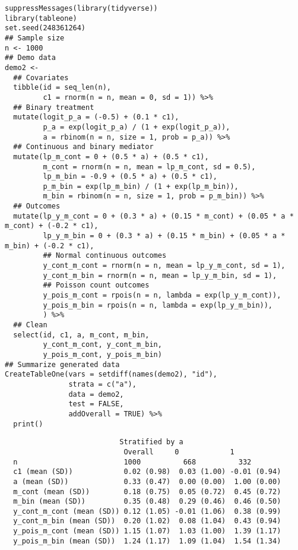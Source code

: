 \documentclass[dvipdfmx,10pt]{article}
\begin{document}
\scriptsize
\begin{verbatim}
suppressMessages(library(tidyverse))
library(tableone)
set.seed(248361264)
## Sample size
n <- 1000
## Demo data
demo2 <-
  ## Covariates
  tibble(id = seq_len(n),
         c1 = rnorm(n = n, mean = 0, sd = 1)) %>%
  ## Binary treatment
  mutate(logit_p_a = (-0.5) + (0.1 * c1),
         p_a = exp(logit_p_a) / (1 + exp(logit_p_a)),
         a = rbinom(n = n, size = 1, prob = p_a)) %>%
  ## Continuous and binary mediator
  mutate(lp_m_cont = 0 + (0.5 * a) + (0.5 * c1),
         m_cont = rnorm(n = n, mean = lp_m_cont, sd = 0.5),
         lp_m_bin = -0.9 + (0.5 * a) + (0.5 * c1),
         p_m_bin = exp(lp_m_bin) / (1 + exp(lp_m_bin)),
         m_bin = rbinom(n = n, size = 1, prob = p_m_bin)) %>%
  ## Outcomes
  mutate(lp_y_m_cont = 0 + (0.3 * a) + (0.15 * m_cont) + (0.05 * a * m_cont) + (-0.2 * c1),
         lp_y_m_bin = 0 + (0.3 * a) + (0.15 * m_bin) + (0.05 * a * m_bin) + (-0.2 * c1),
         ## Normal continuous outcomes
         y_cont_m_cont = rnorm(n = n, mean = lp_y_m_cont, sd = 1),
         y_cont_m_bin = rnorm(n = n, mean = lp_y_m_bin, sd = 1),
         ## Poisson count outcomes
         y_pois_m_cont = rpois(n = n, lambda = exp(lp_y_m_cont)),
         y_pois_m_bin = rpois(n = n, lambda = exp(lp_y_m_bin)),
         ) %>%
  ## Clean
  select(id, c1, a, m_cont, m_bin,
         y_cont_m_cont, y_cont_m_bin,
         y_pois_m_cont, y_pois_m_bin)
## Summarize generated data
CreateTableOne(vars = setdiff(names(demo2), "id"),
               strata = c("a"),
               data = demo2,
               test = FALSE,
               addOverall = TRUE) %>%
  print()
\end{verbatim}

\begin{verbatim}
                           Stratified by a
                            Overall     0            1           
  n                         1000          668          332       
  c1 (mean (SD))            0.02 (0.98)  0.03 (1.00) -0.01 (0.94)
  a (mean (SD))             0.33 (0.47)  0.00 (0.00)  1.00 (0.00)
  m_cont (mean (SD))        0.18 (0.75)  0.05 (0.72)  0.45 (0.72)
  m_bin (mean (SD))         0.35 (0.48)  0.29 (0.46)  0.46 (0.50)
  y_cont_m_cont (mean (SD)) 0.12 (1.05) -0.01 (1.06)  0.38 (0.99)
  y_cont_m_bin (mean (SD))  0.20 (1.02)  0.08 (1.04)  0.43 (0.94)
  y_pois_m_cont (mean (SD)) 1.15 (1.07)  1.03 (1.00)  1.39 (1.17)
  y_pois_m_bin (mean (SD))  1.24 (1.17)  1.09 (1.04)  1.54 (1.34)
\end{verbatim}
\end{document}
